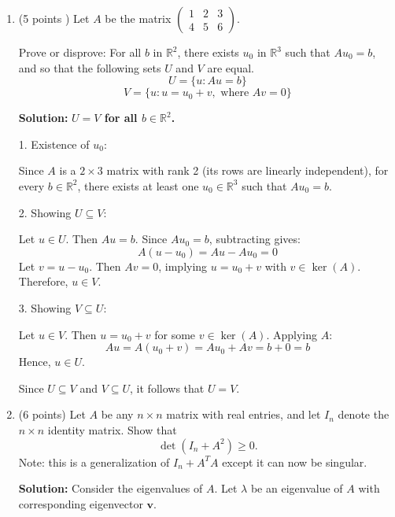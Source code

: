 \documentclass[12pt]{article}
\newcommand{\qspace}{\vspace{1em}} %
\newenvironment{solution}{\noindent\textbf{Solution:} }{\qspace}
\begin{document}
\begin{enumerate}
    \item (5 points ) Let \( A \) be the matrix \( \begin{pmatrix} 1 & 2 & 3 \\ 4 & 5 & 6 \end{pmatrix} \).
      
      Prove or disprove: For all \( b \) in \( \mathbb{R}^2 \), there exists \( u_0 \) in \( \mathbb{R}^3 \) such that \( Au_0 = b \), and so that the following sets \( U \) and \( V \) are equal.
        \[
        U = \{ u : Au = b \}
        \]
        \[
        V = \{ u : u = u_0 + v, \text{ where } Av = 0 \}
        \]
    
    \begin{solution}
\textbf{ \( U = V \) for all \( b \in \mathbb{R}^2 \).}


1. Existence of \( u_0 \):

   Since \( A \) is a \( 2 \times 3 \) matrix with rank 2 (its rows are linearly independent), for every \( b \in \mathbb{R}^2 \), there exists at least one \( u_0 \in \mathbb{R}^3 \) such that \( Au_0 = b \).

2. Showing \( U \subseteq V \):

   Let \( u \in U \). Then \( Au = b \). Since \( Au_0 = b \), subtracting gives:
   \[
   A(u - u_0) = Au - Au_0 = 0
   \]
   Let \( v = u - u_0 \). Then \( Av = 0 \), implying \( u = u_0 + v \) with \( v \in \ker(A) \). Therefore, \( u \in V \).

3. Showing \( V \subseteq U \):

   Let \( u \in V \). Then \( u = u_0 + v \) for some \( v \in \ker(A) \). Applying \( A \):
   \[
   Au = A(u_0 + v) = Au_0 + Av = b + 0 = b
   \]
   Hence, \( u \in U \).


   Since \( U \subseteq V \) and \( V \subseteq U \), it follows that \( U = V \).

\end{solution}
    
    \item (6 points) Let \( A \) be any \( n \times n \) matrix with real entries, and let \( I_n \) denote the \( n \times n \) identity matrix. Show that
    \[
    \det(I_n + A^2) \geq 0.
    \]
    Note: this is a generalization of $I_n+A^TA$ except it can now be singular. 
    
    \begin{solution}
    Consider the eigenvalues of \( A \). Let \( \lambda \) be an eigenvalue of \( A \) with corresponding eigenvector \( \mathbf{v} \).


\end{solution}
\end{enumerate}
\end{document}
